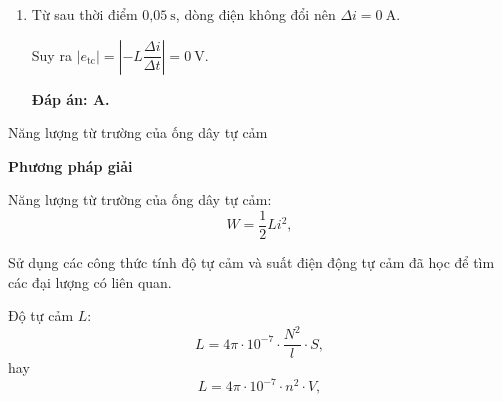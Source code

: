 {{\begin{enumerate}[label=\alph*)]
		Suất điện động tự cảm trong thời gian này:
		
		$\left| e_\text{tc}\right| =\left| -L\dfrac{ \Delta i}{\Delta t}\right| =\text{0,25}\ \text{V}$.
		
		\textbf{	Đáp án: B.}
			
		\item Từ sau thời điểm $\text{0,05}\ \text{s}$, dòng điện không đổi nên $\Delta i=0\ \text{A}$.
		
		Suy ra $\left| e_\text{tc}\right| =\left| -L\dfrac{ \Delta i}{\Delta t}\right| =\text{0}\ \text{V}$.
		
	\textbf{		Đáp án: A.}
	
	\end{enumerate}
	}}
	
\begin{dang}{Năng lượng từ trường của ống dây tự cảm}
\end{dang}
\textbf{Phương pháp giải}

Năng lượng từ trường của ống dây tự cảm:
\begin{equation}
W=\dfrac{1}{2}Li^2,
\end{equation}

Sử dụng các công thức tính độ tự cảm và suất điện động tự cảm đã học để tìm các đại lượng có liên quan.


Độ tự cảm $L$: 
\begin{equation}
L=4\pi \cdot 10^{-7}\cdot \dfrac{N^2}{l}\cdot S,
\end{equation}
hay 
\begin{equation}
L=4\pi \cdot 10^{-7}\cdot n^2 \cdot V,
\end{equation}

\vspace{1em}

{
}	

